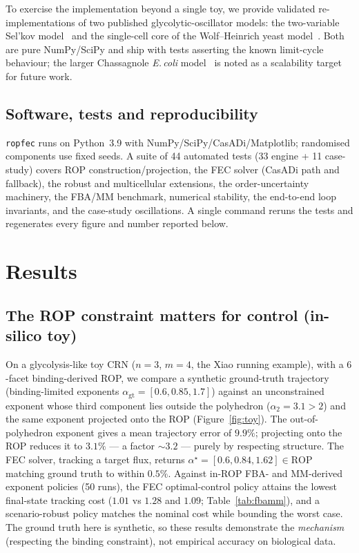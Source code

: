\documentclass[11pt]{article}
\newcommand{\rop}{\mathrm{ROP}}
\begin{document}
To exercise the implementation beyond a single toy, we provide validated
re-implementations of two published glycolytic-oscillator models: the
two-variable Sel'kov model~\citep{selkov1968} and the single-cell core of the
Wolf--Heinrich yeast model~\citep{wolf2000}. Both are pure NumPy/SciPy and ship
with tests asserting the known limit-cycle behaviour; the larger Chassagnole
\emph{E.\,coli} model~\citep{chassagnole2002} is noted as a scalability target
for future work.

\subsection{Software, tests and reproducibility}\label{sec:repro}

\texttt{ropfec} runs on Python~3.9 with NumPy/SciPy/CasADi/Matplotlib; randomised
components use fixed seeds. A suite of 44 automated tests (33 engine + 11
case-study) covers ROP construction/projection, the FEC solver (CasADi path and
fallback), the robust and multicellular extensions, the order-uncertainty
machinery, the FBA/MM benchmark, numerical stability, the end-to-end loop
invariants, and the case-study oscillations. A single command reruns the tests
and regenerates every figure and number reported below.

\section{Results}\label{sec:results}

\subsection{The ROP constraint matters for control (in-silico toy)}\label{sec:toy}

On a glycolysis-like toy CRN ($n=3$, $m=4$, the Xiao running example), with a
$6$-facet binding-derived ROP, we compare a synthetic ground-truth trajectory
(binding-limited exponents $\alpha_{\text{gt}}=[0.6,0.85,1.7]$) against an
unconstrained exponent whose third component lies outside the polyhedron
($\alpha_2=3.1>2$) and the same exponent projected onto the ROP
(Figure~\ref{fig:toy}). The out-of-polyhedron exponent gives a mean trajectory
error of $9.9\%$; projecting onto the ROP reduces it to $3.1\%$ --- a factor
$\sim\!3.2$ --- purely by respecting structure. The FEC solver, tracking a target
flux, returns $\alpha^\star=[0.6,0.84,1.62]\in\rop$ matching ground truth to
within $0.5\%$. Against in-ROP FBA- and MM-derived exponent policies (50 runs),
the FEC optimal-control policy attains the lowest final-state tracking cost
($1.01$ vs $1.28$ and $1.09$; Table~\ref{tab:fbamm}), and a scenario-robust
policy matches the nominal cost while bounding the worst case. The ground truth
here is synthetic, so these results demonstrate the \emph{mechanism} (respecting
the binding constraint), not empirical accuracy on biological data.
\end{document}
